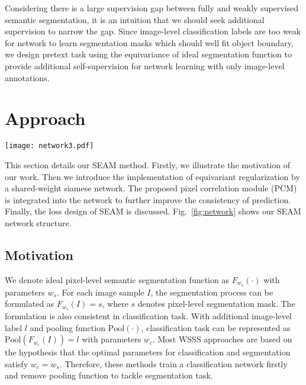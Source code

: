 \documentclass[10pt,twocolumn,letterpaper]{article}
\begin{document}
	Considering there is a large supervision gap between fully and weakly supervised semantic segmentation, it is an intuition that we should seek additional supervision to narrow the gap. Since image-level classification labels are too weak for network to learn segmentation masks which should well fit object boundary, we design pretext task using the equivariance of ideal segmentation function to provide additional self-supervision for network learning with only image-level annotations.

	\section{Approach}
	\begin{figure*}[t]
		\centering
		\texttt{[image: network3.pdf]}
		\caption{The siamese network architecture of our proposed SEAM method. The SEAM is the integration of equivariant regularization (ER) (Section.~\ref{subsec:er}) and pixel correlation module (PCM) (Section.~\ref{subsec:PCM}). With specially designed losses (Section~\ref{subsec:loss}), the revised CAMs not only keep consistent over affine transformation but also well fit the object contour.}
		\label{fig:network}
\end{figure*}
	This section details our SEAM method. Firstly, we illustrate the motivation of our work. Then we introduce the implementation of equivariant regularization by a shared-weight siamese network. The proposed pixel correlation module (PCM) is integrated into the network to further improve the consistency of prediction. Finally, the loss design of SEAM is discussed. Fig.~\ref{fig:network} shows our SEAM network structure.
	
	\subsection{Motivation}
	We denote ideal pixel-level semantic segmentation function as $F_{w_s}(\cdot)$ with parameters $w_s$. For each image sample $I$, the segmentation process can be formulated as $F_{w_s}(I)=s$, where $s$ denotes pixel-level segmentation mask. The formulation is also consistent in classification task. With additional image-level label $l$ and pooling function $\mathrm{Pool}(\cdot)$, classification task can be represented as $\mathrm{Pool}(F_{w_c}(I))=l$ with parameters $w_c$. Most WSSS approaches are based on the hypothesis that the optimal parameters for classification and segmentation satisfy $w_c=w_s$. Therefore, these methods train a classification network firstly and remove pooling function to tackle segmentation task.
	
\end{document}
